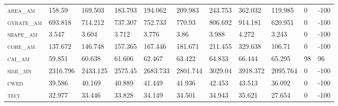 \begin{sidewaystable}[!htbp]
\begin{tabular}{@{}lllllllllll@{}}
\small \textsc{area\_am}        & 158.59          & 169.503         & 183.793          & 194.062          & 209.983          & 243.753          & 362.032           & 119.985       & 0                                                                & -100                                                               \\
\small \textsc{gyrate\_am}      & 693.818         & 714.212         & 737.307          & 752.733          & 770.93           & 806.692          & 914.181           & 620.951       & 0                                                                & -100                                                               \\
\small \textsc{shape\_am}       & 3.547           & 3.604           & 3.712            & 3.776            & 3.86             & 3.988            & 4.272             & 3.243         & 0                                                                & -100                                                               \\
\small \textsc{core\_am}        & 137.672         & 146.748         & 157.365          & 167.446          & 181.671          & 211.455          & 329.638           & 106.71        & 0                                                                & -100                                                               \\
\small \textsc{cai\_am}         & 59.851          & 60.638          & 61.606           & 62.467           & 63.422           & 64.833           & 66.444            & 65.295        & 98                                                               & 96                                                                 \\
\small \textsc{simi\_mn}        & 2316.796        & 2433.125        & 2575.45          & 2683.733         & 2801.744         & 3029.04          & 3918.372          & 2095.764      & 0                                                                & -100                                                               \\
\small \textsc{cwed}            & 39.586          & 40.169          & 40.889           & 41.449           & 41.936           & 42.453           & 43.513            & 36.092        & 0                                                                & -100                                                               \\
\small \textsc{teci}            & 32.977          & 33.446          & 33.828           & 34.149           & 34.501           & 34.943           & 35.621            & 27.654        & 0                                                                & -100                                                               \\

\end{tabular}
\end{sidewaystable}

